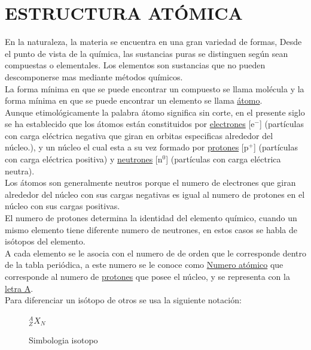 \documentclass[11pt, oneside]{book}
\begin{document}
\chapter{ESTRUCTURA AT\'OMICA}

En la naturaleza, la materia se encuentra en una gran variedad de formas, Desde el punto de vista de la química, las sustancias puras se distinguen según sean compuestas o elementales. Los elementos son sustancias que no pueden descomponerse mas mediante métodos químicos.\\

La forma m\'inima en que se puede encontrar un compuesto se llama mol\'ecula y la forma m\'inima en que se puede encontrar un elemento se llama \ul{\'atomo}.\\

Aunque etimológicamente la palabra átomo significa sin corte, en el presente siglo se ha establecido que los átomos están constituidos por \ul{electrones} [$\mathrm{e^-}$] (partículas con carga eléctrica negativa que giran en orbitas especificas alrededor del núcleo.), y un núcleo el cual esta a su vez formado por \ul{protones} [$\mathrm{p^+}$] (partículas con carga eléctrica positiva) y \ul{neutrones} [$\mathrm{n^0}$] (partículas con carga eléctrica neutra).\\

Los átomos son generalmente neutros porque el numero de electrones que giran alrededor del núcleo con sus cargas negativas es igual al numero de protones en el núcleo con sus cargas positivas.\\

El numero de protones determina la identidad del elemento químico, cuando un mismo elemento tiene diferente numero de neutrones, en estos casos se habla de isótopos del elemento.\\

A cada elemento se le asocia con el numero de de orden que le corresponde dentro de la tabla periódica, a este numero se le conoce como \ul{Numero at\'omico} que corresponde al numero de \ul{protones} que posee el núcleo, y se representa con la \ul{letra A}.\\

Para diferenciar un isótopo de otros se usa la siguiente notación:
\newline

\begin{figure}
  \hspace{20mm}
  \begin{centering}
    \Huge${}^A_ZX_N$
  \end{centering}
  \caption{Simbologia isotopo}
\end{figure}
\end{document}
